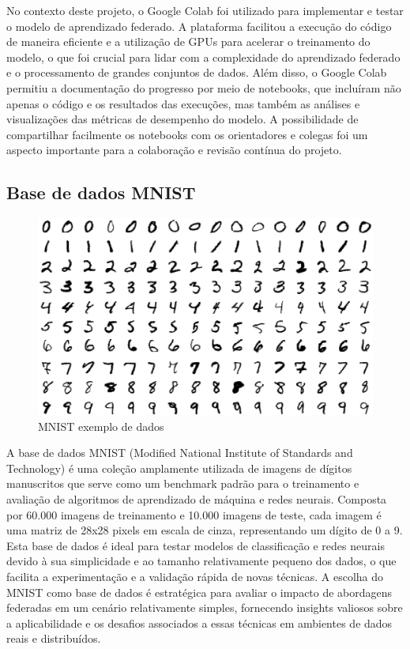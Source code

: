 No contexto deste projeto, o Google Colab foi utilizado para implementar e testar o modelo de aprendizado federado. A plataforma facilitou a execução do código de maneira eficiente e a utilização de GPUs para acelerar o treinamento do modelo, o que foi crucial para lidar com a complexidade do aprendizado federado e o processamento de grandes conjuntos de dados. Além disso, o Google Colab permitiu a documentação do progresso por meio de notebooks, que incluíram não apenas o código e os resultados das execuções, mas também as análises e visualizações das métricas de desempenho do modelo. A possibilidade de compartilhar facilmente os notebooks com os orientadores e colegas foi um aspecto importante para a colaboração e revisão contínua do projeto.

\subsection{Base de dados MNIST}

\begin{figure}[ht]
	\centering
	\includegraphics[scale=0.25]{figuras/referencialTecnologico/mnist.eps}
	\caption{MNIST exemplo de dados}
	\label{fig:mnist}
\end{figure}

A base de dados MNIST (Modified National Institute of Standards and Technology) é uma coleção amplamente utilizada de imagens de dígitos manuscritos que serve como um benchmark padrão para o treinamento e avaliação de algoritmos de aprendizado de máquina e redes neurais. Composta por 60.000 imagens de treinamento e 10.000 imagens de teste, cada imagem é uma matriz de 28x28 pixels em escala de cinza, representando um dígito de 0 a 9. Esta base de dados é ideal para testar modelos de classificação e redes neurais devido à sua simplicidade e ao tamanho relativamente pequeno dos dados, o que facilita a experimentação e a validação rápida de novas técnicas. A escolha do MNIST como base de dados é estratégica para avaliar o impacto de abordagens federadas em um cenário relativamente simples, fornecendo insights valiosos sobre a aplicabilidade e os desafios associados a essas técnicas em ambientes de dados reais e distribuídos.

